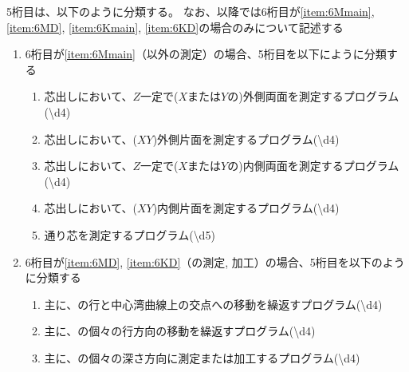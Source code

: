 \clearpage
5桁目は、以下のように分類する。
なお、以降では6桁目が\ref{item:6Mmain}, \ref{item:6MD}, \ref{item:6Kmain}, \ref{item:6KD}の場合のみについて記述する
\begin{enumerate}[label=\alph*)]
\item 6桁目が\ref{item:6Mmain}（\Dimple 以外の測定）の場合、5桁目を以下にように分類する
  \begin{enumerate}[label=\arabic*., ref=\arabic*, start=1]
  \item%
    芯出しにおいて、$Z$一定で($X$または$Y$の)外側両面を測定するプログラム({\textbackslash d{4}})
  \item%
    芯出しにおいて、($XY$)外側片面を測定するプログラム({\textbackslash d{4}})
  \item%
    芯出しにおいて、$Z$一定で($X$または$Y$の)内側両面を測定するプログラム({\textbackslash d{4}})
  \item%
    芯出しにおいて、($XY$)内側片面を測定するプログラム({\textbackslash d{4}})
  \item%
    通り芯を測定するプログラム({\textbackslash d{5}})
  \end{enumerate}
\item 6桁目が\ref{item:6MD}, \ref{item:6KD}（\Dimple の測定, 加工）の場合、5桁目を以下のように分類する
  \begin{enumerate}[label=\arabic*., ref=\arabic*]
  \item 主に、\Dimple の行と中心湾曲線上の交点への移動を繰返すプログラム({\textbackslash d{4}})
  \item 主に、\Dimple の個々の行方向の移動を繰返すプログラム({\textbackslash d{4}})
  \item 主に、\Dimple の個々の深さ方向に測定または加工するプログラム({\textbackslash d{4}})
  \end{enumerate}

\end{enumerate}
